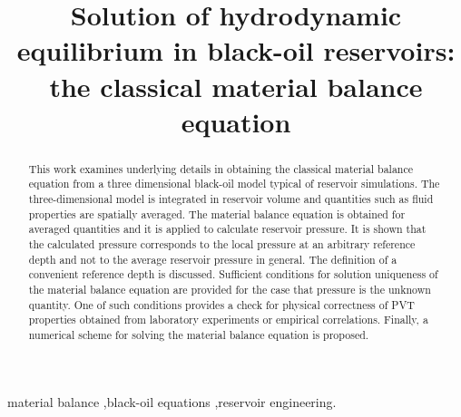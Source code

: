 \documentclass[authoryear,preprint,review,11pt]{elsarticle}
\begin{document}
\begin{frontmatter}
\title{Solution of hydrodynamic equilibrium in black-oil reservoirs: the classical material balance equation}

%



\begin{abstract}
This work examines underlying details in obtaining the classical material balance equation from a three dimensional black-oil model typical of reservoir simulations. The three-dimensional model is integrated in reservoir volume and quantities such as fluid properties are spatially averaged. The material balance equation is obtained for averaged quantities and it is applied to calculate reservoir pressure. It is shown that the calculated pressure corresponds to the local pressure at an arbitrary reference depth and not to the average reservoir pressure in general. The definition of a convenient reference depth is discussed. Sufficient conditions for solution uniqueness of the material balance equation are provided for the case that pressure is the unknown quantity. One of such conditions provides a check for physical correctness of PVT properties obtained from laboratory experiments or empirical correlations.
Finally, a numerical scheme for solving the material balance equation is proposed.
\end{abstract}

\begin{keyword}
material balance \sep black-oil equations \sep reservoir engineering.
\end{keyword}
\end{frontmatter}
\end{document}
